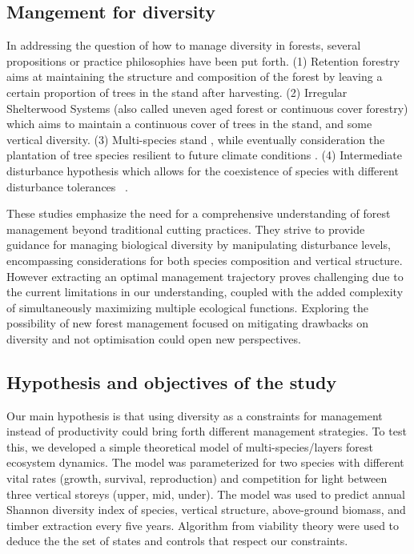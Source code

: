 \documentclass{article}
\begin{document}
\subsection{Mangement for diversity}

In addressing the question of how to manage diversity in forests, several propositions or practice philosophies have been put forth. (1) Retention forestry \autocite{gustafssonRetentionForestryMaintain2012,rosenvaldWhatWhenWhere2008} aims at maintaining the structure and composition of the forest by leaving a certain proportion of trees in the stand after harvesting. (2) Irregular Shelterwood Systems (also called uneven aged forest or continuous cover forestry) \autocite{sinhaOptimalManagementNaturally2017,schallImpactEvenagedUnevenaged2018,nylandEvenUnevenagedChallenges2003,noletComparingEffectsEven2018,dudumanForestManagementPlanning2011} which aims to maintain a continuous cover of trees in the stand, and some vertical diversity. (3) Multi-species stand \autocite{morinTreeSpeciesRichness2011,jourdanManagingMixedStands2021}, while eventually consideration the plantation of tree species resilient to future climate conditions \autocite{websterPromotingMaintainingDiversity2018}. (4) Intermediate disturbance hypothesis which allows for the coexistence of species with different disturbance tolerances ~\autocite{connellDiversityTropicalRain1978}.

These studies emphasize the need for a comprehensive understanding of forest management beyond traditional cutting practices. They strive to provide guidance for managing biological diversity by manipulating disturbance levels, encompassing considerations for both species composition and vertical structure. However extracting an optimal management trajectory proves challenging due to the current limitations in our understanding, coupled with the added complexity of simultaneously maximizing multiple ecological functions. Exploring the possibility of new forest management focused on mitigating drawbacks on diversity and not optimisation could open new perspectives.\\

\subsection{Hypothesis and objectives of the study}

Our main hypothesis is that using diversity as a constraints for management instead of productivity could bring forth different management strategies. To test this, we developed a simple theoretical model of multi-species/layers forest ecosystem dynamics. The model was parameterized for two species with different vital rates (growth, survival, reproduction) and competition for light between three vertical storeys (upper, mid, under). The model was used to predict annual Shannon diversity index of species, vertical structure, above-ground biomass, and timber extraction every five years.  Algorithm from viability theory were used to deduce the the set of states and controls that respect our constraints.
\end{document}
